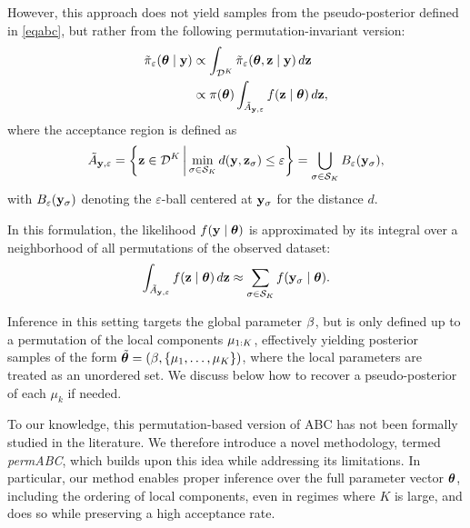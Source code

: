 However, this approach does not yield samples from the pseudo-posterior defined in \eqref{eqabc}, but rather from the following permutation-invariant version:
\begin{equation} 
    \label{eqpermabc_tilde}
    \begin{split}
        \Tilde \pi_{\varepsilon} (\boldsymbol{\theta} \mid \mathbf{y})  & \propto \int_{\mathcal{D}^K} \Tilde \pi_{\varepsilon} (\boldsymbol{\theta} , \mathbf{z} \mid \mathbf{y}) \, d\mathbf{z} \\
        & \propto \pi(\boldsymbol{\theta}) \int_{\Tilde A_{\mathbf{y},\varepsilon}} f(\mathbf{z} \mid \boldsymbol{\theta}) \, d\mathbf{z},
    \end{split}
\end{equation}
where the acceptance region is defined as
\[
\tilde{A}_{\mathbf{y},\varepsilon} = \left\{\mathbf{z} \in \mathcal{D}^K \,\middle|\, \min_{\sigma \in \mathcal{S}_K} d(\mathbf{y}, \mathbf{z}_{\sigma}) \leq \varepsilon \right\} = \bigcup_{\sigma \in \mathcal{S}_K} B_{\varepsilon}(\mathbf{y}_{\sigma}),
\]
with \( B_{\varepsilon}(\mathbf{y}_{\sigma}) \) denoting the \( \varepsilon \)-ball centered at \( \mathbf{y}_{\sigma} \) for the distance \( d \).

In this formulation, the likelihood \( f(\mathbf{y} \mid \boldsymbol{\theta}) \) is approximated by its integral over a neighborhood of all permutations of the observed dataset:
\[
\int_{\tilde{A}_{\mathbf{y},\varepsilon}} f(\mathbf{z} \mid \boldsymbol{\theta}) \, d\mathbf{z} \approx \sum_{\sigma \in \mathcal{S}_K} f(\mathbf{y}_{\sigma} \mid \boldsymbol{\theta}).
\]

Inference in this setting targets the global parameter \( \beta \), but is only defined up to a permutation of the local components \( \mu_{1:K} \), effectively yielding posterior samples of the form \( \Tilde{\boldsymbol{\theta}} = (\beta, \{\mu_1, \dots, \mu_K\})\), where the local parameters are treated as an unordered set.  We discuss below how to recover a pseudo-posterior of each $\mu_k$ if needed.

To our knowledge, this permutation-based version of ABC has not been formally studied in the literature. We therefore introduce a novel methodology, termed \emph{permABC}, which builds upon this idea while addressing its limitations. In particular, our method enables proper inference over the full parameter vector \( \boldsymbol{\theta} \), including the ordering of local components, even in regimes where \( K \) is large, and does so while preserving a high acceptance rate.

